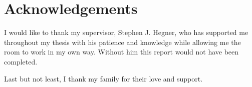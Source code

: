 \chapter{Acknowledgements}
\label{chap:acknowledgements}
I would like to thank my supervisor, Stephen J. Hegner, who has supported me 
throughout my thesis with his patience and knowledge 
while allowing me the room to work in my own way. 
Without him this report would not have been completed.

Last but not least, I thank my family for their love and support.